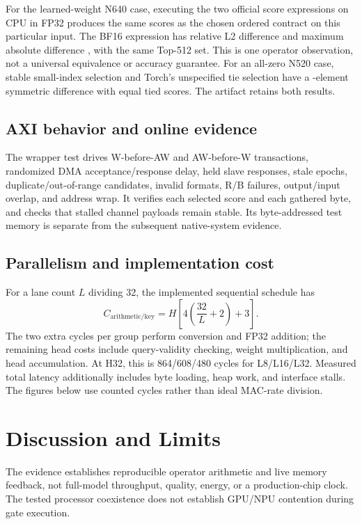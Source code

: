\documentclass[conference]{IEEEtran}
\begin{document}


For the learned-weight N640 case, executing the two official score expressions on CPU in FP32 produces the same scores as the chosen ordered contract on this particular input. The BF16 expression has relative L2 difference \BfRelative{} and maximum absolute difference \BfAbsolute{}, with the same Top-512 set. This is one operator observation, not a universal equivalence or accuracy guarantee. For an all-zero N520 case, stable small-index selection and Torch's unspecified tie selection have a \TieDifference{}-element symmetric difference with equal tied scores. The artifact retains both results.

\subsection{AXI behavior and online evidence}
The wrapper test drives W-before-AW and AW-before-W transactions, randomized DMA acceptance/response delay, held slave responses, stale epochs, duplicate/out-of-range candidates, invalid formats, R/B failures, output/input overlap, and address wrap. It verifies each selected score and each gathered byte, and checks that stalled channel payloads remain stable. Its byte-addressed test memory is separate from the subsequent native-system evidence.




\subsection{Parallelism and implementation cost}
For a lane count $L$ dividing 32, the implemented sequential schedule has
\begin{equation}
 C_{\mathrm{arithmetic/key}}=H\left[4\left(\frac{32}{L}+2\right)+3\right].
\end{equation}
The two extra cycles per group perform conversion and FP32 addition; the remaining head costs include query-validity checking, weight multiplication, and head accumulation. At H32, this is 864/608/480 cycles for L8/L16/L32. Measured total latency additionally includes byte loading, heap work, and interface stalls. The figures below use counted cycles rather than ideal MAC-rate division.


\section{Discussion and Limits}
The evidence establishes reproducible operator arithmetic and live memory feedback, not full-model throughput, quality, energy, or a production-chip clock. The tested processor coexistence does not establish GPU/NPU contention during gate execution.
\end{document}
